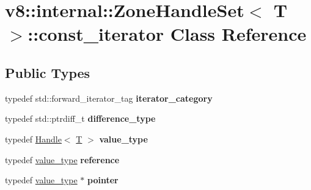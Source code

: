 \hypertarget{classv8_1_1internal_1_1ZoneHandleSet_1_1const__iterator}{}\section{v8\+:\+:internal\+:\+:Zone\+Handle\+Set$<$ T $>$\+:\+:const\+\_\+iterator Class Reference}
\label{classv8_1_1internal_1_1ZoneHandleSet_1_1const__iterator}
\subsection*{Public Types}
\begin{DoxyCompactItemize}
\item 
\mbox{\label{classv8_1_1internal_1_1ZoneHandleSet_1_1const__iterator_afe2b6b571757b15491e5abac967422de}} 
typedef std\+::forward\+\_\+iterator\+\_\+tag {\bfseries iterator\+\_\+category}
\item 
\mbox{\label{classv8_1_1internal_1_1ZoneHandleSet_1_1const__iterator_ac4ab2993929ea03e1630c7cab1efc025}} 
typedef std\+::ptrdiff\+\_\+t {\bfseries difference\+\_\+type}
\item 
\mbox{\label{classv8_1_1internal_1_1ZoneHandleSet_1_1const__iterator_a1190ec42ec5b0627924d53c404387e64}} 
typedef \mbox{\hyperlink{classv8_1_1internal_1_1Handle}{Handle}}$<$ \mbox{\hyperlink{classv8_1_1internal_1_1torque_1_1T}{T}} $>$ {\bfseries value\+\_\+type}
\item 
\mbox{\label{classv8_1_1internal_1_1ZoneHandleSet_1_1const__iterator_a39a1dca9f67238ec1e01f57ae9a8ddc8}} 
typedef \mbox{\hyperlink{classv8_1_1internal_1_1Handle}{value\+\_\+type}} {\bfseries reference}
\item 
\mbox{\label{classv8_1_1internal_1_1ZoneHandleSet_1_1const__iterator_a5c9dbcebe43f5f1f8105521dadbb282d}} 
typedef \mbox{\hyperlink{classv8_1_1internal_1_1Handle}{value\+\_\+type}} $\ast$ {\bfseries pointer}
\end{DoxyCompactItemize}
